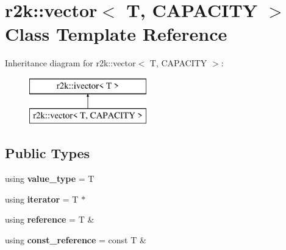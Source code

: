 \hypertarget{classr2k_1_1vector}{}\section{r2k\+:\+:vector$<$ T, C\+A\+P\+A\+C\+I\+TY $>$ Class Template Reference}
\label{classr2k_1_1vector}
Inheritance diagram for r2k\+:\+:vector$<$ T, C\+A\+P\+A\+C\+I\+TY $>$\+:\begin{figure}[H]
\begin{center}
\leavevmode
\includegraphics[height=2.000000cm]{classr2k_1_1vector}
\end{center}
\end{figure}
\subsection*{Public Types}
\begin{DoxyCompactItemize}
\item 
\mbox{\label{classr2k_1_1vector_a9739a9c18db0500ee97ba4070c9b01cf}} 
using {\bfseries value\+\_\+type} = T
\item 
\mbox{\label{classr2k_1_1vector_ac0124e2cc6a974eed52ffb62de966b5f}} 
using {\bfseries iterator} = T $\ast$
\item 
\mbox{\label{classr2k_1_1vector_aba7ed5b7b6e16ff08a8a0e85fe3a9ef8}} 
using {\bfseries reference} = T \&
\item 
\mbox{\label{classr2k_1_1vector_a9cb5351b24fb72b7841fe05f5bf3911b}} 
using {\bfseries const\+\_\+reference} = const T \&
\end{DoxyCompactItemize}

